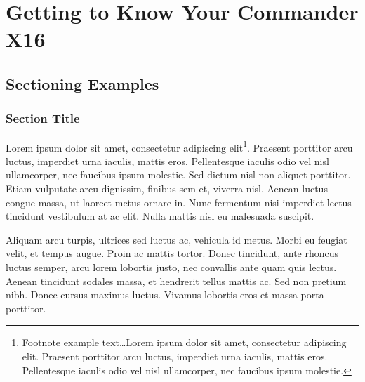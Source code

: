 \documentclass[
	11pt, %
	fleqn, %
	letterpaper, %
]{CommodoreBlueBook}
\begin{document}

\part{Getting to Know Your Commander X16}


\chapterspaceabove{6.75cm} %
\chapterspacebelow{7.25cm} %


\chapter{Sectioning Examples}

\section{Section Title}

Lorem ipsum dolor sit amet, consectetur adipiscing elit\footnote{Footnote
example text\ldots Lorem ipsum dolor sit amet, consectetur adipiscing elit.
Praesent porttitor arcu luctus, imperdiet urna iaculis, mattis eros.
Pellentesque iaculis odio vel nisl ullamcorper, nec faucibus ipsum molestie.}.
Praesent porttitor arcu luctus, imperdiet urna iaculis, mattis eros.
Pellentesque iaculis odio vel nisl ullamcorper, nec faucibus ipsum molestie.
Sed dictum nisl non aliquet porttitor. Etiam vulputate arcu dignissim, finibus
sem et, viverra nisl. Aenean luctus congue massa, ut laoreet metus ornare in.
Nunc fermentum nisi imperdiet lectus tincidunt vestibulum at ac elit. Nulla
mattis nisl eu malesuada suscipit.

Aliquam arcu turpis, ultrices sed luctus ac, vehicula id metus. Morbi eu
feugiat velit, et tempus augue. Proin ac mattis tortor. Donec tincidunt, ante
rhoncus luctus semper, arcu lorem lobortis justo, nec convallis ante quam quis
lectus. Aenean tincidunt sodales massa, et hendrerit tellus mattis ac. Sed non
pretium nibh. Donec cursus maximus luctus. Vivamus lobortis eros et massa porta
porttitor.
\end{document}

